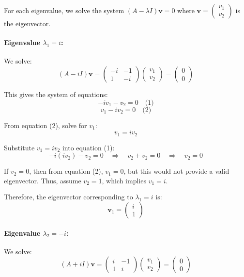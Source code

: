 \documentclass[11pt]{article}
\begin{document}
For each eigenvalue, we solve the system \( (A - \lambda I) \mathbf{v} = 0 \) where \( \mathbf{v} = \begin{pmatrix} v_1 \\ v_2 \end{pmatrix} \) is the eigenvector.

\paragraph{Eigenvalue \( \lambda_1 = i \):}

We solve:
\[
(A - iI) \mathbf{v} = \begin{pmatrix} -i & -1 \\ 1 & -i \end{pmatrix} \begin{pmatrix} v_1 \\ v_2 \end{pmatrix} = \begin{pmatrix} 0 \\ 0 \end{pmatrix}
\]

This gives the system of equations:
\[
-iv_1 - v_2 = 0 \quad \text{(1)}
\]
\[
v_1 - iv_2 = 0 \quad \text{(2)}
\]

From equation (2), solve for \( v_1 \):
\[
v_1 = iv_2
\]

Substitute \( v_1 = iv_2 \) into equation (1):
\[
-i(iv_2) - v_2 = 0 \quad \Rightarrow \quad v_2 + v_2 = 0 \quad \Rightarrow \quad v_2 = 0
\]

If \( v_2 = 0 \), then from equation (2), \( v_1 = 0 \), but this would not provide a valid eigenvector. Thus, assume \( v_2 = 1 \), which implies \( v_1 = i \).

Therefore, the eigenvector corresponding to \( \lambda_1 = i \) is:
\[
\mathbf{v}_1 = \begin{pmatrix} i \\ 1 \end{pmatrix}
\]

\paragraph{Eigenvalue \( \lambda_2 = -i \):}

We solve:
\[
(A + iI) \mathbf{v} = \begin{pmatrix} i & -1 \\ 1 & i \end{pmatrix} \begin{pmatrix} v_1 \\ v_2 \end{pmatrix} = \begin{pmatrix} 0 \\ 0 \end{pmatrix}
\]
\end{document}
